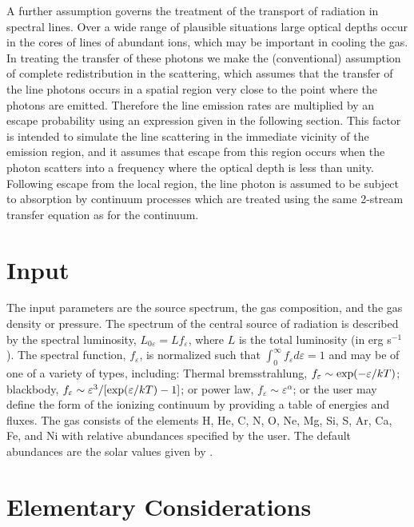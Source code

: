 A further assumption governs the treatment of the transport of 
radiation in spectral lines.  Over a  wide range of
plausible situations large optical depths occur in the cores   of
lines of abundant ions, which may be important in cooling
the gas.  In treating the transfer of these photons we make 
the (conventional) assumption of complete redistribution 
in the scattering, which assumes that the transfer of the 
line photons occurs in a spatial region very close to the 
point where the photons are emitted.  Therefore the line 
emission rates are multiplied by an escape probability 
using an expression given in the following section.
This factor is intended to simulate the line scattering in the immediate vicinity 
of the emission region, and it assumes that escape from this region 
occurs when the photon scatters into a frequency where the optical depth is 
less than unity.  Following escape from the local region, the line photon
is assumed to be subject to absorption by continuum processes which 
are treated using the same 2-stream transfer equation as for the 
continuum.

\section{Input}

The input parameters  are the source spectrum, the gas composition, and the gas density 
or pressure.  The spectrum of the central source of radiation is described by  the spectral 
luminosity, $L_{0\varepsilon}=Lf_\varepsilon$, where $L$ is the total
luminosity (in erg s$^{-1}$).  The spectral function, $f_\varepsilon$,
is normalized such that $\int_0^\infty f_\varepsilon d\varepsilon=1$  and 
may be of one   of a variety of types, including:  Thermal bremsstrahlung, 
$f_\varepsilon\sim {\rm exp}(-\varepsilon/kT)$;  blackbody,  
$f_\varepsilon\sim\varepsilon^3/[{\rm exp}(\varepsilon/kT) -1]$; 
or   power law, $f_\varepsilon\sim\varepsilon^{\alpha}$; or the user
may define the form of the ionizing continuum by providing a table of 
energies and fluxes.   The gas consists of the elements H, He, C, N, O, Ne, Mg, 
Si, S, Ar, Ca, Fe, and Ni  with  relative abundances specified by the user.  
The default abundances are the solar values given by \cite{Grevesse1996}.

\section{Elementary Considerations}

